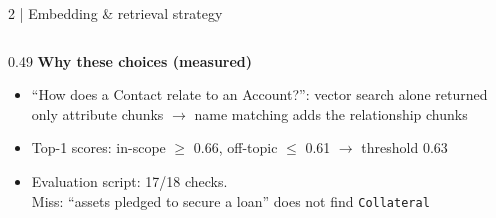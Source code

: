 \documentclass[aspectratio=169,10pt]{beamer}
\newcommand{\code}[1]{\texttt{#1}}
\begin{document}
\begin{frame}{2 \;|\; Embedding \& retrieval strategy}
\begin{columns}[T]
\begin{column}{0.49\textwidth}
\vspace{1mm}
\small\textbf{\color{accent}Why these choices (measured)}
\scriptsize
\begin{itemize}
  \item ``How does a Contact relate to an Account?'': vector search alone returned
        only attribute chunks $\rightarrow$ name matching adds the relationship chunks
  \item Top-1 scores: in-scope $\ge$ 0.66, off-topic $\le$ 0.61 $\rightarrow$ threshold 0.63
  \item Evaluation script: 17/18 checks.\\
        Miss: ``assets pledged to secure a loan'' does not find \code{Collateral}
\end{itemize}
\end{column}
\end{columns}
\end{frame}
\end{document}
